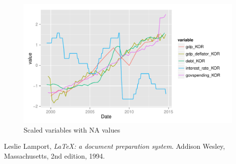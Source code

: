 \documentclass[12pt]{article}
\begin{document}
\begin{figure}
  \centering
    \includegraphics{na_plot_KOR.pdf}
  \caption{Scaled variables with NA values}
  \label{fig:na_plot_KOR}
\end{figure}

\newpage

\begin{thebibliography}{9}

  Leslie Lamport,
  \emph{\LaTeX: a document preparation system}.
  Addison Wesley, Massachusetts,
  2nd edition,
  1994.

\end{thebibliography}
\end{document}
